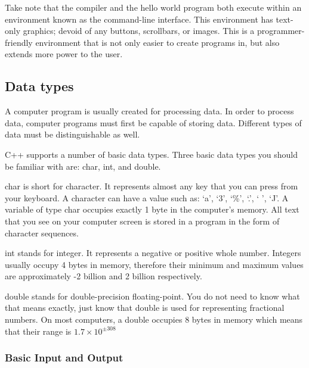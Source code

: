 \documentclass[a4paper,12pt]{article}
\begin{document}
Take note that the compiler and the hello world program both execute within an environment known as the command-line interface. This environment has text-only graphics; devoid of any buttons, scrollbars, or images. This is a programmer-friendly environment that is not only easier to create programs in, but also extends more power to the user. 

\subsection*{Data types}

A computer program is usually created for processing data. In order to process data, computer programs must first be capable of storing data. Different types of data must be distinguishable as well. 

C++ supports a number of basic data types. Three basic data types you should be familiar with are: char, int, and double. 

char is short for character. It represents almost any key that you can press from your keyboard. A character can have a value such as: `a', `3', `\%', `.', ` ', `J'. A variable of type char occupies exactly 1 byte in the computer's memory. All text that you see on your computer screen is stored in a program in the form of character sequences. 

int stands for integer. It represents a negative or positive whole number. Integers usually occupy 4 bytes in memory, therefore their minimum and maximum values are approximately -2 billion and 2 billion respectively. 

double stands for double-precision floating-point. You do not need to know what that means exactly, just know that double is used for representing fractional numbers. On most computers, a double occupies 8 bytes in memory which means that their range is $1.7 \times 10^{\pm 308}$

\subsubsection*{Basic Input and Output}
\end{document}
